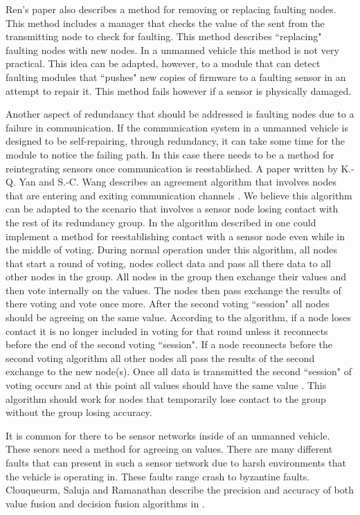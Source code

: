 \documentclass[twoside, conference]{IEEEtran}
\begin{document}
Ren's paper also describes a method for removing or replacing faulting nodes. This method includes a manager that checks the value of the sent from the transmitting node to check for faulting. This method describes ``replacing" faulting nodes with new nodes. In a unmanned vehicle this method is not very practical. This idea can be adapted, however, to a module that can detect faulting modules that ``pushes" new copies of firmware to a faulting sensor in an attempt to repair it. This method fails however if a sensor is physically damaged.\cite{Ren2001}

Another aspect of redundancy that should be addressed is faulting nodes due to a failure in communication. If the communication system in a unmanned vehicle is designed to be self-repairing, through redundancy, it can take some time for the module to notice the failing path. In this case there needs to be a method for reintegrating sensors once communication is reestablished. A paper written by K.-Q. Yan and S.-C. Wang describes an agreement algorithm that involves nodes that are entering and exiting communication channels \cite{Yan2007}. We believe this algorithm can be adapted to the scenario that involves a sensor node losing contact with the rest of its redundancy group. In the algorithm described in \cite{Yan2007} one could implement a method for reestablishing contact with a sensor node even while in the middle of voting. During normal operation under this algorithm, all nodes that start a round of voting, nodes collect data and pass all there data to all other nodes in the group. All nodes in the group then exchange their values and then vote internally on the values. The nodes then pass exchange the results of there voting and vote once more. After the second voting ``session" all nodes should be agreeing on the same value. According to the algorithm, if a node loses contact it is no longer included in voting for that round unless it reconnects before the end of the second voting ``session". If a node reconnects before the second voting algorithm all other nodes all pass the results of the second exchange to the new node(s). Once all data is transmitted the second ``session" of voting occurs and at this point all values should have the same value \cite{Yan2007}. This algorithm should work for nodes that temporarily lose contact to the group without the group losing accuracy.

It is common for there to be sensor networks inside of an unmanned vehicle. These senors need a method for agreeing on values. There are many different faults that can present in such a sensor network due to harsh environments that the vehicle is operating in. These faults range crash to byzantine faults. Clouqueurm, Saluja and Ramanathan describe the precision and accuracy of both value fusion and decision fusion algorithms in \cite{clouqueur2004}. 
\end{document}
